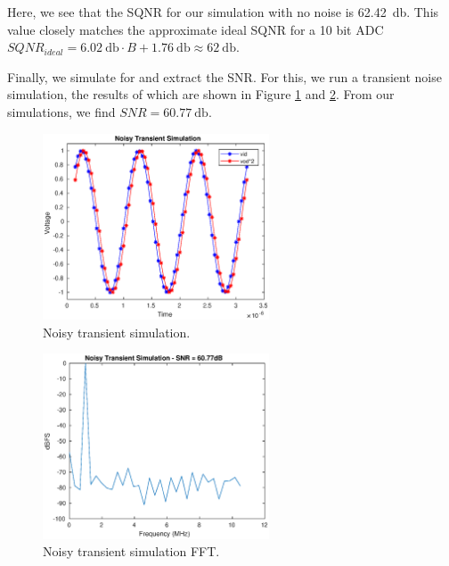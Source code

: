 \documentclass[letterpaper, notitlepage]{revtex4-1}
\begin{document}
  Here, we see that the SQNR for our simulation with no noise is
  \SI{62.42}{\decibel}. This value closely matches the approximate ideal SQNR
  for a 10 bit ADC
  $SQNR_{ideal}=\SI{6.02}{\decibel}\cdot B+\SI{1.76}{\decibel}\approx\SI{62}{\decibel}$.

  Finally, we simulate for and extract the SNR. For this, we run a transient
  noise simulation, the results of which are shown in Figure
  \ref{fig:NoisyTransient} and \ref{fig:NoisyTransientFFT}. From our
  simulations, we find $SNR=\SI{60.77}{\decibel}$.

  \begin{figure}[h]
    \begin{center}
      \includegraphics[width=0.6\textwidth]{noisy_transient_sig.eps}
      \caption{Noisy transient simulation.}
      \label{fig:NoisyTransient}
    \end{center}
  \end{figure}

  \begin{figure}[h]
    \begin{center}
      \includegraphics[width=0.6\textwidth]{noisy_transient_fft.eps}
      \caption{Noisy transient simulation FFT.}
      \label{fig:NoisyTransientFFT}
    \end{center}
  \end{figure}
\end{document}
